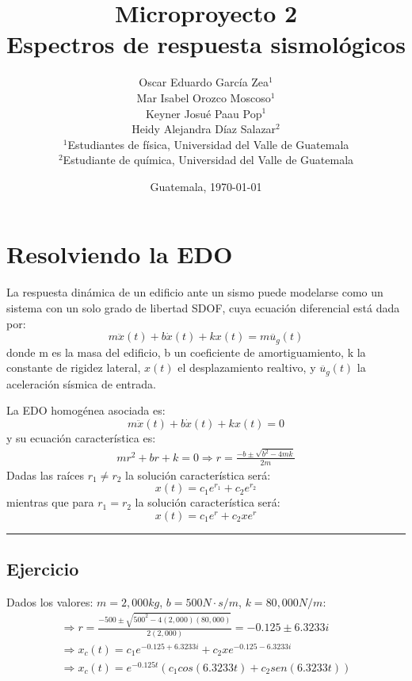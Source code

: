\documentclass[12pt,letterpaper]{article}
\title{\textbf{Microproyecto 2}\\[0.5ex]Espectros de respuesta sismológicos}
\author{
  Oscar Eduardo García Zea$^{1}$\\
  Mar Isabel Orozco Moscoso$^{1}$\\
  Keyner Josué Paau Pop$^{1}$\\
  Heidy Alejandra Díaz Salazar$^{2}$\\
  {\small $^{1}$Estudiantes de física, Universidad del Valle de Guatemala}\\
  {\small $^{2}$Estudiante de química, Universidad del Valle de Guatemala}}
\date{Guatemala, \today}
\begin{document}
\maketitle %
\thispagestyle{fancy}

\section{Resolviendo la EDO}
La respuesta dinámica de un edificio ante un sismo puede modelarse como un sistema con un solo grado de libertad SDOF, cuya
ecuación diferencial está dada por:
\begin{equation*}
    m\ddot{x}(t) + b\dot{x}(t) + kx(t) = m\ddot{u_g}(t) 
\end{equation*}
donde m es la masa del edificio, b un coeficiente de amortiguamiento, k la constante de rigidez lateral, $x(t)$ el desplazamiento realtivo,
y $\ddot{u_g}(t)$ la aceleración sísmica de entrada.

La EDO homogénea asociada es:
\begin{equation*}
    m\ddot{x}(t) + b\dot{x}(t) + kx(t) = 0
\end{equation*}
y su ecuación característica es:
\begin{gather*}
    mr^2 + br + k = 0
    \Rightarrow r = \frac{-b\pm \sqrt{b^2-4mk}}{2m}
\end{gather*}
Dadas las raíces $r_1 \neq r_2$ la solución característica será:
\begin{equation*}
    x(t) = c_1e^{r_1}+c_2e^{r_2}
\end{equation*}
mientras que para $r_1 = r_2$ la solución característica será:
\begin{equation*}
x(t) = c_1e^{r}+c_2xe^{r}
\end{equation*}

\noindent\rule{\textwidth}{0.4pt}

\subsection{Ejercicio}
Dados los valores: $m = 2,000 kg$,  $b = 500 N \cdot s/m$,  $k = 80,000 N/m$:
\begin{gather*}
    \Rightarrow r = \frac{-500\pm \sqrt{500^2-4(2,000)(80,000)}}{2(2,000)} =  -0.125 \pm 6.3233i \\
    \Rightarrow x_c(t) = c_1e^{-0.125 + 6.3233i}+c_2xe^{-0.125 - 6.3233i} \\
    \Rightarrow x_c(t) = e^{-0.125t}(c_1cos(6.3233t)+c_2sen(6.3233t))
\end{gather*}
\end{document}
